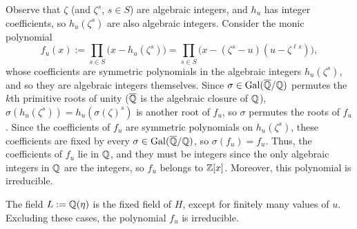 \documentclass[../main.tex]{subfiles}
\begin{document}
Observe that $\zeta$ (and $\zeta^s$, $s\in S$) are algebraic integers, and $h_u$ has integer coefficients, so $h_u(\zeta^s)$ are also algebraic integers. Consider the monic polynomial
\begin{equation}\label{eq:polinomi}
	f_u(x):=\prod_{s\in S}\big(x-h_u(\zeta^s)\big)=\prod_{s\in S}\big(x-(\zeta^s-u)(u-\zeta^{\ell s})\big),
\end{equation}
whose coefficients are symmetric polynomials in the algebraic integers $h_u(\zeta^s)$, and so they are algebraic integers themselves. Since $\sigma\in\operatorname{Gal}(\overline{\mathbb{Q}}/\mathbb{Q})$ permutes the $k$th primitive roots of unity ($\overline{\mathbb{Q}}$ is the algebraic closure of $\mathbb{Q}$), $\sigma(h_u(\zeta^s))=h_u(\sigma(\zeta)^s)$ is another root of $f_u$, so $\sigma$ permutes the roots of $f_u$. Since the coefficients of $f_u$ are symmetric polynomials on $h_u(\zeta^s)$, these coefficients are fixed by every $\sigma\in\operatorname{Gal}(\overline{\mathbb{Q}}/\mathbb{Q})$, so $\sigma(f_u)=f_u$. Thus, the coefficients of $f_u$ lie in $\mathbb{Q}$, and they must be integers since the only algebraic integers in $\mathbb{Q}$ are the integers, so $f_u$ belongs to $\mathbb{Z}[x]$. Moreover, this polynomial is irreducible.
\begin{proposition}\label{prop:fuirreducible}
	The field $L:=\mathbb{Q}(\eta)$ is the fixed field of $H$, except for finitely many values of $u$. Excluding these cases, the polynomial $f_u$ is irreducible.
\end{proposition}
\end{document}
